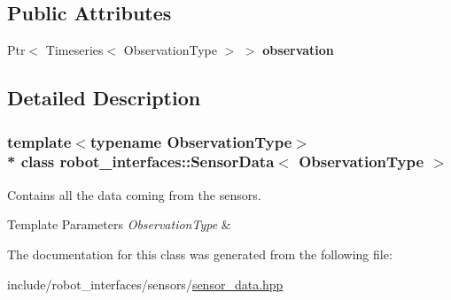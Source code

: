 \subsection*{Public Attributes}
\begin{DoxyCompactItemize}
\item 
Ptr$<$ Timeseries$<$ Observation\+Type $>$ $>$ {\bfseries observation}\hypertarget{classrobot__interfaces_1_1SensorData_a9e8e89e8583883ab1c84cbd72bea7440}{}\label{classrobot__interfaces_1_1SensorData_a9e8e89e8583883ab1c84cbd72bea7440}

\end{DoxyCompactItemize}


\subsection{Detailed Description}
\subsubsection*{template$<$typename Observation\+Type$>$\\*
class robot\+\_\+interfaces\+::\+Sensor\+Data$<$ Observation\+Type $>$}

Contains all the data coming from the sensors. 


\begin{DoxyTemplParams}{Template Parameters}
{\em Observation\+Type} & \\
\hline
\end{DoxyTemplParams}


The documentation for this class was generated from the following file\+:\begin{DoxyCompactItemize}
\item 
include/robot\+\_\+interfaces/sensors/\hyperlink{sensor__data_8hpp}{sensor\+\_\+data.\+hpp}\end{DoxyCompactItemize}
